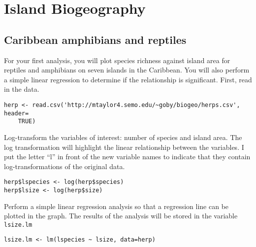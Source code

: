 \documentclass[11pt]{article}
\begin{document}
\thispagestyle{first_page}


\section*{Island Biogeography}


\subsection*{Caribbean amphibians and reptiles}

For your first analysis, you will plot species richness against island area for reptiles and amphibians on seven islands in the Caribbean. You will also perform a simple linear regression to determine if the relationship is significant. First, read in the data.

{\small 
\begin{verbatim}
herp <- read.csv('http://mtaylor4.semo.edu/~goby/biogeo/herps.csv', header=
    TRUE)
\end{verbatim}}

Log-transform the variables of interest: number of species and island area. The log transformation will highlight the linear relationship between the variables. I put the letter ``l'' in front of the new variable names to indicate that they contain log-transformations of the original data.

\begin{verbatim}
herp$lspecies <- log(herp$species)
herp$lsize <- log(herp$size)

\end{verbatim}

Perform a simple linear regression analysis so that a regression line can be plotted in the graph. The results of the analysis will be stored in the variable \texttt{lsize.lm}

\begin{verbatim}
lsize.lm <- lm(lspecies ~ lsize, data=herp)

\end{verbatim}
\end{document}
